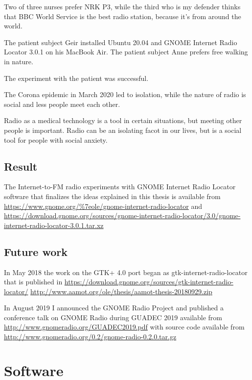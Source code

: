 \documentclass[a4paper,norsk,utf8]{report}
\begin{document}
    Two of three nurses prefer NRK P3, while the third who is my defender 
    thinks that BBC World Service is the best radio station, because it's
    from around the world.

    The patient subject Geir installed Ubuntu 20.04 and GNOME Internet Radio
    Locator 3.0.1 on his MacBook Air.  The patient subject Anne prefers free
    walking in nature.

    The experiment with the patient was successful.

    The Corona epidemic in March 2020 led to isolation, while the nature of
    radio is social and less people meet each other.

    Radio as a medical technology is a tool in certain situations, but meeting
    other people is important.  Radio can be an isolating facot in our lives,
    but is a social tool for people with social anxiety. 
    
\chapter{Result}

    The Internet-to-FM radio experiments with GNOME Internet Radio Locator software that finalizes the ideas explained in this thesis is
    available from \url{https://www.gnome.org/%7eole/gnome-internet-radio-locator} and
    \url{https://download.gnome.org/sources/gnome-internet-radio-locator/3.0/gnome-internet-radio-locator-3.0.1.tar.xz}

\chapter{Future work}

    In May 2018 the work on the GTK+ 4.0 port began as
    gtk-internet-radio-locator that is published in
    \url{https://download.gnome.org/sources/gtk-internet-radio-locator/}
    \url{http://www.aamot.org/ole/thesis/aamot-thesis-20180929.zip}

    In August 2019 I announced the GNOME Radio Project and published a
    conference talk on GNOME Radio during GUADEC 2019 available from
    \url{http://www.gnomeradio.org/GUADEC2019.pdf} with source code
    available from \url{http://www.gnomeradio.org/0.2/gnome-radio-0.2.0.tar.gz}

\part{Software}
\end{document}
